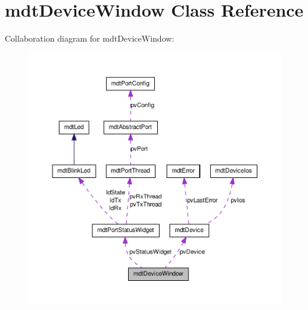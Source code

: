 \hypertarget{classmdt_device_window}{
\section{mdtDeviceWindow Class Reference}
\label{classmdt_device_window}
}


Collaboration diagram for mdtDeviceWindow:
\nopagebreak
\begin{figure}[H]
\begin{center}
\leavevmode
\includegraphics[width=400pt]{classmdt_device_window__coll__graph}
\end{center}
\end{figure}
